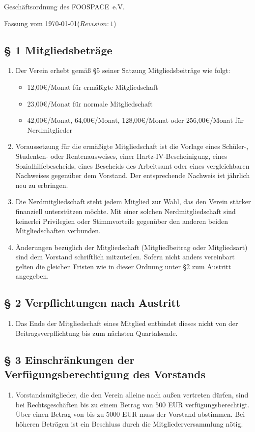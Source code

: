 \documentclass[10pt,a4paper]{article}
\newcommand{\name}{FOOSPACE}
\newcommand{\revision}{$Revision: 1$}
\begin{document}
{\LARGE Geschäftsordnung des \name\ e.V.}

Fassung vom \today (\revision)

\subsection*{§ 1 Mitgliedsbeträge}
\begin{enumerate}
\item Der Verein erhebt gemäß §5 seiner Satzung Mitgliedsbeiträge wie folgt:
	\begin{itemize}
	\item 12,00€/Monat für ermäßigte Mitgliedschaft
	\item 23,00€/Monat für normale Mitgliedschaft
	\item 42,00€/Monat, 64,00€/Monat, 128,00€/Monat oder 256,00€/Monat für Nerdmitglieder
	\end{itemize}
\item Voraussetzung für die ermäßigte Mitgliedschaft ist die Vorlage eines
	Schüler-, Studenten- oder Rentenausweises, einer Hartz-IV-Bescheinigung,
	eines Sozialhilfebescheids, eines Bescheids des Arbeitsamt
	oder eines vergleichbaren Nachweises gegenüber dem Vorstand.
	Der entsprechende Nachweis ist jährlich neu zu erbringen.
\item Die Nerdmitgliedschaft steht jedem Mitglied zur Wahl, das den Verein stärker
	finanziell unterstützen möchte. Mit einer solchen
	Nerdmitgliedschaft sind keinerlei Privilegien oder Stimmvorteile gegenüber
	den anderen beiden Mitgliedschaften verbunden.
\item Änderungen bezüglich der Mitgliedschaft (Mitgliedbeitrag oder Mitgliedsart)
	sind dem Vorstand schriftlich mitzuteilen. Sofern nicht anders
	vereinbart gelten die gleichen Fristen wie in dieser Ordnung unter §2
	zum Austritt angegeben.
\end{enumerate}

\subsection*{§ 2 Verpflichtungen nach Austritt}
\begin{enumerate}
\item Das Ende der Mitgliedschaft eines Mitglied entbindet dieses nicht von der
	Beitragsverpflichtung bis zum nächsten Quartalsende.
\end{enumerate}

\subsection*{§ 3 Einschränkungen der Verfügungsberechtigung des Vorstands}
\begin{enumerate}
\item Vorstandsmitglieder, die den Verein alleine nach außen vertreten
    dürfen, sind bei Rechtsgeschäften bis zu einem Betrag von 500 EUR
    verfügungsberechtigt. Über einen Betrag von bis zu 5000 EUR muss der
    Vorstand abstimmen. Bei höheren Beträgen ist ein Beschluss durch die
    Mitgliederversammlung nötig.
\end{enumerate}
\end{document}
